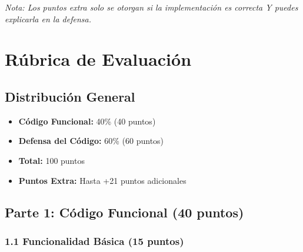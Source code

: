 \documentclass[12pt,a4paper]{article}
\begin{document}
\textit{Nota: Los puntos extra solo se otorgan si la implementación es correcta Y puedes explicarla en la defensa.}

\newpage

\section{Rúbrica de Evaluación}

\subsection{Distribución General}

\begin{itemize}
    \item \textbf{Código Funcional:} 40\% (40 puntos)
    \item \textbf{Defensa del Código:} 60\% (60 puntos)
    \item \textbf{Total:} 100 puntos
    \item \textbf{Puntos Extra:} Hasta +21 puntos adicionales
\end{itemize}

\subsection{Parte 1: Código Funcional (40 puntos)}

\subsubsection{1.1 Funcionalidad Básica (15 puntos)}
\end{document}
